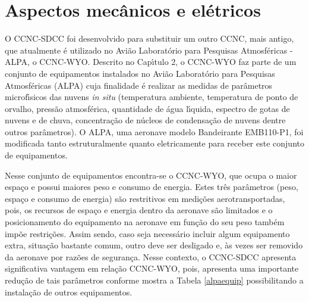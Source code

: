 




\section {Aspectos mec\^{a}nicos e el\'{e}tricos}
O CCNC-SDCC foi desenvolvido para substituir um outro CCNC, mais antigo, que atualmente \'{e} utilizado no Avi\~{a}o Laborat\'{o}rio para Pesquisas Atmosf\'{e}ricas - ALPA, o CCNC-WYO. Descrito no Cap\'{\i}tulo 2, o CCNC-WYO faz parte de um conjunto de equipamentos instalados no Avi\~{a}o Laborat\'{o}rio para Pesquisas Atmosf\'{e}ricas (ALPA) cuja finalidade \'{e} realizar as medidas de par\^{a}metros microf\'{\i}sicos das nuvens \textit{in situ} (temperatura ambiente, temperatura de ponto de orvalho, press\~{a}o atmosf\'{e}rica, quantidade de \'{a}gua l\'{\i}quida, espectro de gotas de nuvens e de chuva, concentra\c{c}\~{a}o de n\'{u}cleos de condensa\c{c}\~{a}o de nuvens dentre outros par\^{a}metros). O ALPA, uma aeronave modelo Bandeirante EMB110-P1, foi modificada tanto estruturalmente quanto eletricamente para receber este conjunto de equipamentos.

Nesse conjunto de equipamentos encontra-se o CCNC-WYO, que ocupa o maior espa\c{c}o e possui maiores peso e consumo de energia. Estes tr\^{e}s par\^{a}metros (peso, espa\c{c}o e consumo de energia) s\~{a}o restritivos em medi\c{c}\~{o}es aerotransportadas, pois, os recursos de espa\c{c}o e energia dentro da aeronave s\~{a}o limitados e o posicionamento do equipamento na aeronave em fun\c{c}\~{a}o do seu peso tamb\'{e}m imp\~{o}e restri\c{c}\~{o}es. Assim sendo, caso seja necess\'{a}rio incluir algum equipamento extra, situa\c{c}\~{a}o bastante comum, outro deve ser desligado e, \`{a}s vezes ser removido da aeronave por raz\~{o}es de seguran\c{c}a. Nesse contexto, o CCNC-SDCC apresenta significativa vantagem em rela\c{c}\~{a}o CCNC-WYO, pois, apresenta uma importante redu\c{c}\~{a}o de tais par\^{a}metros conforme mostra a Tabela \ref{alpaequip} possibilitando a instala\c{c}\~{a}o de outros equipamentos.



